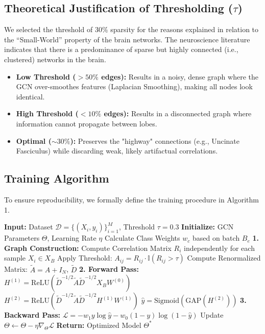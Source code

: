 \documentclass[journal]{IEEEtran}
\begin{document}
\subsection{Theoretical Justification of Thresholding (\texorpdfstring{$\tau$}{tau})}
We selected the threshold of $30\%$ sparsity for the reasons explained in relation to the ``Small-World'' property of the brain networks. The neuroscience literature indicates that there is a predominance of sparse but highly connected (i.e., clustered) networks in the brain.
\begin{itemize}
    \item \textbf{Low Threshold ($>50\%$ edges):} Results in a noisy, dense graph where the GCN over-smoothes features (Laplacian Smoothing), making all nodes look identical.
    \item \textbf{High Threshold ($<10\%$ edges):} Results in a disconnected graph where information cannot propagate between lobes.
    \item \textbf{Optimal ($\sim 30\%$):} Preserves the "highway" connections (e.g., Uncinate Fasciculus) while discarding weak, likely artifactual correlations.
\end{itemize}

\subsection{Training Algorithm}
To ensure reproducibility, we formally define the training procedure in Algorithm 1.

\begin{algorithm}[!ht]
\small
\caption{Spatial-GCN Training Loop}\label{alg:gcn}
\begin{algorithmic}[1]
\State \textbf{Input:} Dataset $\mathcal{D} = \{(X_i, y_i)\}_{i=1}^M$, Threshold $\tau=0.3$
\State \textbf{Initialize:} GCN Parameters $\Theta$, Learning Rate $\eta$
    \State Calculate Class Weights $w_c$ based on batch $B_e$
        \State \textbf{1. Graph Construction:}
        \State \quad Compute Correlation Matrix $R_i$ independently for each sample $X_i \in X_B$
        \State \quad Apply Threshold: $A_{ij} = R_{ij} \cdot \mathbb{I}(R_{ij} > \tau)$
        \State \quad Compute Renormalized Matrix: $\tilde{A} = A + I_N$, $\tilde{D}$
        \State \textbf{2. Forward Pass:}
        \State \quad $H^{(1)} = \text{ReLU}(\tilde{D}^{-1/2} \tilde{A} \tilde{D}^{-1/2} X_B W^{(0)})$
        \State \quad $H^{(2)} = \text{ReLU}(\tilde{D}^{-1/2} \tilde{A} \tilde{D}^{-1/2} H^{(1)} W^{(1)})$
        \State \quad $\hat{y} = \text{Sigmoid}(\text{GAP}(H^{(2)}))$
        \State \textbf{3. Backward Pass:}
        \State \quad $\mathcal{L} = - w_{1} y \log \hat{y} - w_{0} (1-y)\log(1-\hat{y})$
        \State \quad Update $\Theta \leftarrow \Theta - \eta \nabla_\Theta \mathcal{L}$
    \EndFor
\EndFor
\State \textbf{Return:} Optimized Model $\Theta^*$
\end{algorithmic}
\end{algorithm}
\end{document}
